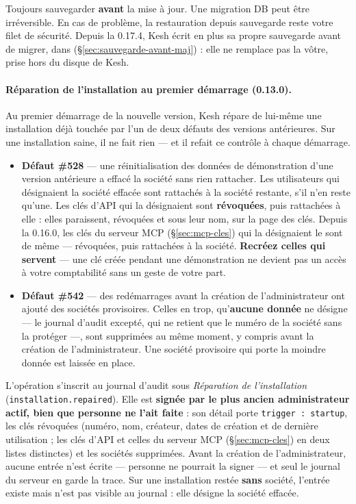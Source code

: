 \documentclass[a4paper,11pt,oneside]{article}
\begin{document}
\begin{keshwarning}
Toujours sauvegarder \textbf{avant} la mise à jour. Une migration DB peut être irréversible. En cas de problème, la restauration depuis sauvegarde reste votre filet de sécurité. Depuis la 0.17.4, Kesh écrit en plus sa propre sauvegarde avant de migrer, dans  (\S\ref{sec:sauvegarde-avant-maj}) : elle ne remplace pas la vôtre, prise hors du disque de Kesh.
\end{keshwarning}

\paragraph{Réparation de l'installation au premier démarrage (0.13.0).}\label{sec:reparation-installation}
Au premier démarrage de la nouvelle version, Kesh répare de lui-même une installation déjà touchée par l'un de deux défauts des versions antérieures. Sur une installation saine, il ne fait rien --- et il refait ce contrôle à chaque démarrage.

\begin{itemize}
    \item \textbf{Défaut \#528} --- une réinitialisation des données de démonstration d'une version antérieure a effacé la société sans rien rattacher. Les utilisateurs qui désignaient la société effacée sont rattachés à la société restante, s'il n'en reste qu'une. Les clés d'API qui la désignaient sont \textbf{révoquées}, puis rattachées à elle : elles paraissent, révoquées et sous leur nom, sur la page des clés. Depuis la 0.16.0, les clés du serveur MCP (\S\ref{sec:mcp-cles}) qui la désignaient le sont de même --- révoquées, puis rattachées à la société. \textbf{Recréez celles qui servent} --- une clé créée pendant une démonstration ne devient pas un accès à votre comptabilité sans un geste de votre part.
    \item \textbf{Défaut \#542} --- des redémarrages avant la création de l'administrateur ont ajouté des sociétés provisoires. Celles en trop, qu'\textbf{aucune donnée} ne désigne --- le journal d'audit excepté, qui ne retient que le numéro de la société sans la protéger ---, sont supprimées au même moment, y compris avant la création de l'administrateur. Une société provisoire qui porte la moindre donnée est laissée en place.
\end{itemize}

\begin{sloppypar}
L'opération s'inscrit au journal d'audit sous \emph{Réparation de l'installation} (\texttt{installation.repaired}). Elle est \textbf{signée par le plus ancien administrateur actif, bien que personne ne l'ait faite} : son détail porte \texttt{trigger~: startup}, les clés révoquées (numéro, nom, créateur, dates de création et de dernière utilisation ; les clés d'API et celles du serveur MCP (\S\ref{sec:mcp-cles}) en deux listes distinctes) et les sociétés supprimées. Avant la création de l'administrateur, aucune entrée n'est écrite --- personne ne pourrait la signer --- et seul le journal du serveur en garde la trace. Sur une installation restée \textbf{sans} société, l'entrée existe mais n'est pas visible au journal : elle désigne la société effacée.
\end{sloppypar}
\end{document}
